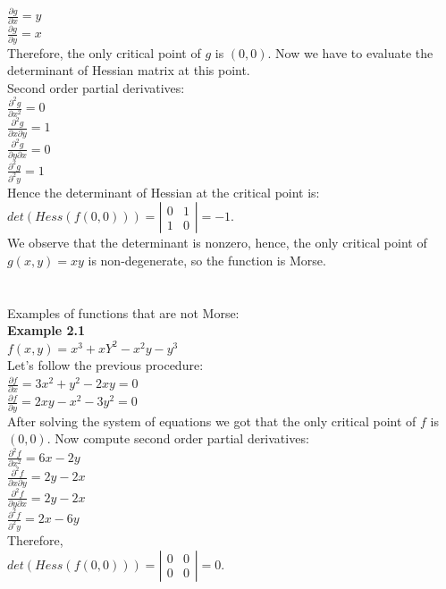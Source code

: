 \documentclass[]{article}
\begin{document}
$\frac{\partial g}{\partial x}=y$\\
$\frac{\partial g}{\partial y}=x$\\
Therefore, the only critical point of $g$ is $(0,0)$. Now we have to evaluate the determinant of Hessian matrix at this point.\\
Second order partial derivatives: \\
$\frac{\partial^2 g}{\partial x^2}=0$\\
$\frac{\partial^2 g}{\partial x \partial y}=1$\\
$\frac{\partial^2 g}{\partial y \partial x}=0$\\
$\frac{\partial^2 g}{\partial^2 y}=1$\\
Hence the determinant of Hessian at the critical point is: \\
$det(Hess(f(0,0)))=\left| \begin{array}{cc} 0 & 1 \\ 1 & 0 \end{array} \right|=-1$. \\
We observe that the determinant is nonzero, hence, the only critical point of $g(x,y)=xy$ is non-degenerate, so the function is Morse. \\
\\
\\
Examples of functions that are not Morse: \\
\textbf{Example 2.1}\\
$f(x,y)=x^3+xY^2-x^2y-y^3$\\
Let's follow the previous procedure: \\
$\frac{\partial f}{\partial x}=3x^2+y^2-2xy=0$\\
$\frac{\partial f}{\partial y}=2xy-x^2-3y^2=0$\\
After solving the system of equations we got that the only critical point of $f$ is $(0,0)$. Now compute second order partial derivatives:\\
$\frac{\partial^2 f}{\partial x^2}=6x-2y$\\
$\frac{\partial^2 f}{\partial x \partial y}=2y-2x$\\
$\frac{\partial^2 f}{\partial y \partial x}=2y-2x$\\
$\frac{\partial^2 f}{\partial^2 y}=2x-6y$\\
Therefore, \\
$det(Hess(f(0,0)))=\left| \begin{array}{cc} 0 & 0 \\ 0 & 0 \end{array} \right|=0$.\\
\end{document}
